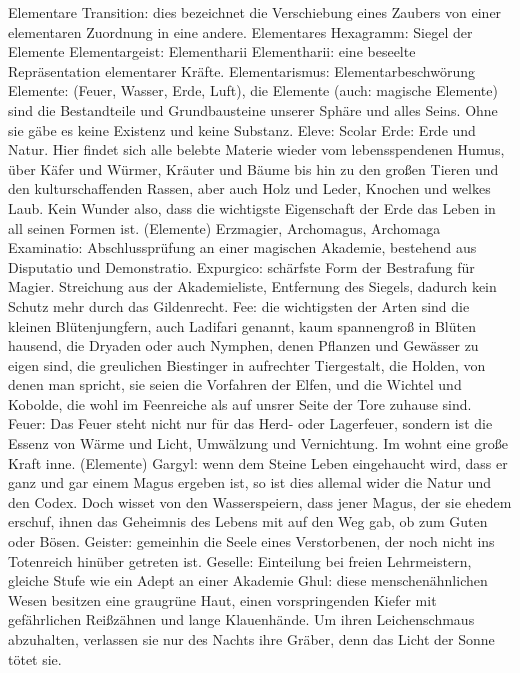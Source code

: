 \documentclass[a5paper,8pt]{book}
\begin{document}
Elementare Transition: dies bezeichnet die Ver­schiebung eines Zaubers von einer elementaren Zu­ordnung in eine andere.
Elementares Hexagramm: \textit{}Siegel der Elemente
Elementargeist: \textit{}Elementharii
Elementharii: eine beseelte Repräsentation elemen­tarer Kräfte.
Elementarismus: \textit{}Elementarbeschwörung
Elemente: \textit{}(Feuer, Wasser, Erde, Luft), die Elemente (auch: magische Elemente) sind die Bestandteile und Grundbausteine unserer Sphäre und alles Seins. Ohne sie gäbe es keine Existenz und keine Substanz.
Eleve: \textit{}Scolar
Erde: Erde und Natur. Hier findet sich alle belebte Materie wieder vom lebensspendenen Humus, über Käfer und Würmer, Kräuter und Bäume bis hin zu den großen Tieren und den kulturschaffenden Rassen, aber auch Holz und Leder, Knochen und welkes Laub. Kein Wunder also, dass die wichtigste Eigenschaft der Erde das Leben in all seinen Formen ist. (\textit{}Elemente)
Erzmagier, \textit{}Archomagus, Archomaga
Examinatio: Abschlussprüfung an einer magischen Akademie, bestehend aus \textit{}Disputatio und \textit{}Demon­stratio.
Expurgico: schärfste Form der Bestrafung für Magier. Streichung aus der Akademieliste, Entfernung des Siegels, dadurch kein Schutz mehr durch das Gildenrecht.
Fee: die wichtigsten der Arten sind die kleinen Blütenjungfern, auch Ladifari genannt, kaum spannen­groß in Blüten hausend, die Dryaden oder auch Nymphen, denen Pflanzen und Gewässer zu eigen sind, die greulichen Biestinger in aufrechter Tiergestalt, die Holden, von denen man spricht, sie seien die Vorfahren der Elfen, und die Wichtel und Kobolde, die wohl im Feenreiche als auf unsrer Seite der Tore zuhause sind.
Feuer: Das Feuer steht nicht nur für das Herd- oder Lagerfeuer, sondern ist die Essenz von Wärme und Licht, Umwälzung und Vernichtung. Im wohnt eine große Kraft inne. (\textit{}Elemente)
Gargyl: wenn dem Steine Leben eingehaucht wird, dass er ganz und gar einem Magus ergeben ist, so ist dies allemal wider die Natur und den Codex. Doch wisset von den Wasserspeiern, dass jener Magus, der sie ehedem erschuf, ihnen das Geheimnis des Lebens mit auf den Weg gab, ob zum Guten oder Bösen.
Geister: gemeinhin die Seele eines Verstorbenen, der noch nicht ins Totenreich hinüber getreten ist.
Geselle: Einteilung bei freien Lehrmeistern, gleiche Stufe wie ein \textit{}Adept an einer Akademie
Ghul: diese menschenähnlichen Wesen besitzen eine graugrüne Haut, einen vorspringenden Kiefer mit gefährlichen Reißzähnen und lange Klauenhände. Um ihren Leichenschmaus abzuhalten, verlassen sie nur des Nachts ihre Gräber, denn das Licht der Sonne tötet sie.
\end{document}
